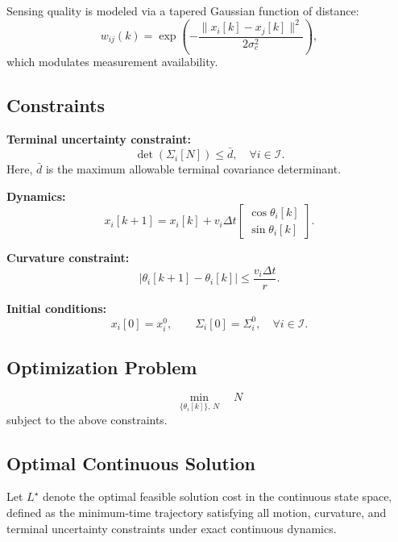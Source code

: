 Sensing quality is modeled via a tapered Gaussian function of distance:
\[
w_{ij}(k) = \exp\left(-\frac{\|x_i[k]-x_j[k]\|^2}{2\sigma_c^2}\right),
\]
which modulates measurement availability.

\subsection{Constraints}

\textbf{Terminal uncertainty constraint:}
\[
\det(\Sigma_i[N]) \le \bar{d}, \quad \forall i \in \mathcal{I}.
\]
Here, $\bar{d}$ is the maximum allowable terminal covariance determinant.

\textbf{Dynamics:}
\[
x_i[k+1] = x_i[k] + v_i \Delta t
\begin{bmatrix}
\cos \theta_i[k] \\
\sin \theta_i[k]
\end{bmatrix}.
\]

\textbf{Curvature constraint:}
\[
|\theta_i[k+1] - \theta_i[k]| \le \frac{v_i \Delta t}{r}.
\]

\textbf{Initial conditions:}
\[
x_i[0] = x_i^0, \qquad \Sigma_i[0] = \Sigma_i^0, \quad \forall i \in \mathcal{I}.
\]

\subsection{Optimization Problem}

\[
\min_{\{\theta_i[k]\},\,N} \quad N
\]
subject to the above constraints.

\subsection{Optimal Continuous Solution}

Let $L^\star$ denote the optimal feasible solution cost in the continuous state space, defined as the minimum-time trajectory satisfying all motion, curvature, and terminal uncertainty constraints under exact continuous dynamics.